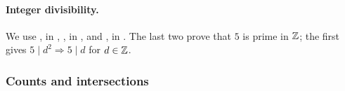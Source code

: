 \begin{mergedproofsection}
\paragraph{Integer divisibility.}
\uses{}
We use , in ,
, in ,
and , in .
The last two prove that $5$ is prime in ${\mathbb Z}$; the first gives
$5\mid d^2\Rightarrow5\mid d$ for $d\in{\mathbb Z}$.

\par\endgroup

\subsubsection{Counts and intersections}


\end{mergedproofsection}
